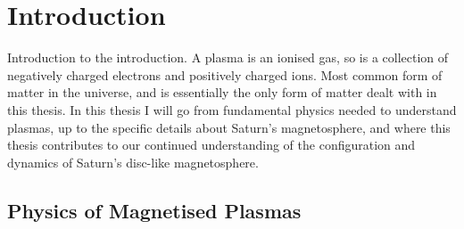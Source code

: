 \chapter{Introduction}

\label{chap:intro}
Introduction to the introduction. 
A plasma is an ionised gas, so is a collection of negatively charged electrons and positively charged ions. Most common form of matter in the universe, and is essentially the only form of matter dealt with in this thesis.
In this thesis I will go from fundamental physics needed to understand plasmas, up to the specific details about  Saturn's magnetosphere, and where this thesis contributes to our continued understanding of the configuration and dynamics of Saturn's disc-like magnetosphere.
\section{Physics of Magnetised Plasmas}


